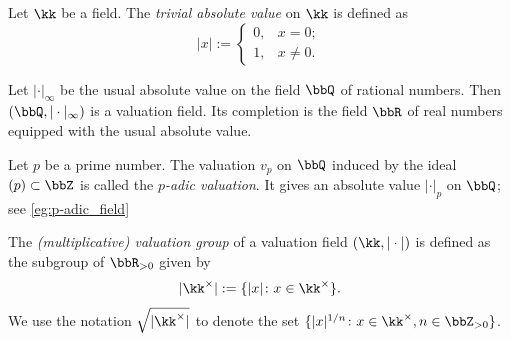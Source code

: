     \begin{example}\label{eg:trivial_absolute_value_on_any_fields}
        Let \(\kk\) be a field.
        The \emph{trivial absolute value} on \(\kk\) is defined as
        \[ |x| := \begin{cases}
            0, & x = 0; \\
            1, & x \neq 0.
        \end{cases} \]
    \end{example}

    \begin{example}\label{eg:usual_absolute_value_on_Q}
        Let \(|\cdot|_\infty\) be the usual absolute value on the field \(\bbQ\) of rational numbers.
        Then \((\bbQ, |\cdot|_\infty)\) is a valuation field.
        Its completion is the field \(\bbR\) of real numbers equipped with the usual absolute value.
    \end{example}

    \begin{example}\label{eg:p-adic_absolute_value_on_Q}
        Let \(p\) be a prime number.
        The valuation \(v_p\) on \(\bbQ\) induced by the ideal \((p) \subset \bbZ\) is called the \emph{\(p\)-adic valuation}.
        It gives an absolute value \(|\cdot|_p\) on \(\bbQ\); see \cref{eg:p-adic_field}
    \end{example}

    \begin{definition}\label{def:valuation_group_of_a_valuation_field}
        The \emph{(multiplicative) valuation group} of a valuation field \((\kk,|\cdot|)\) is defined as the subgroup of \(\bbR_{>0}\) given by
        \[ |\kk^\times| := \{|x|\colon x \in \kk^\times\}. \]
        We use the notation \(\sqrt{|\kk^\times|}\) to denote the set \(\{|x|^{1/n}\colon x \in \kk^\times, n \in \bbZ_{>0}\}\).
    \end{definition}

